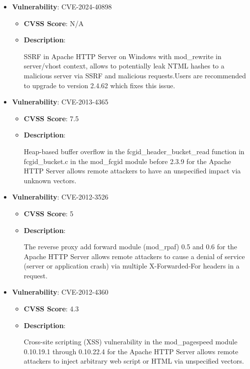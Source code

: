\documentclass{article}
\begin{document}
\begin{itemize}
        \item \textbf{Vulnerability}: CVE-2024-40898
        \begin{itemize}
            \item \textbf{CVSS Score}:  N/A 
            \item \textbf{Description}:
            \parbox[t]{0.9\linewidth}{
                \ttfamily SSRF in Apache HTTP Server on Windows with mod\_rewrite in server/vhost context, allows to potentially leak NTML hashes to a malicious server via SSRF and malicious requests.Users are recommended to upgrade to version 2.4.62 which fixes this issue.
            }
        \end{itemize}
    
        \item \textbf{Vulnerability}: CVE-2013-4365
        \begin{itemize}
            \item \textbf{CVSS Score}:  7.5 
            \item \textbf{Description}:
            \parbox[t]{0.9\linewidth}{
                \ttfamily Heap-based buffer overflow in the fcgid\_header\_bucket\_read function in fcgid\_bucket.c in the mod\_fcgid module before 2.3.9 for the Apache HTTP Server allows remote attackers to have an unspecified impact via unknown vectors.
            }
        \end{itemize}
    
        \item \textbf{Vulnerability}: CVE-2012-3526
        \begin{itemize}
            \item \textbf{CVSS Score}:  5 
            \item \textbf{Description}:
            \parbox[t]{0.9\linewidth}{
                \ttfamily The reverse proxy add forward module (mod\_rpaf) 0.5 and 0.6 for the Apache HTTP Server allows remote attackers to cause a denial of service (server or application crash) via multiple X-Forwarded-For headers in a request.
            }
        \end{itemize}
    
        \item \textbf{Vulnerability}: CVE-2012-4360
        \begin{itemize}
            \item \textbf{CVSS Score}:  4.3 
            \item \textbf{Description}:
            \parbox[t]{0.9\linewidth}{
                \ttfamily Cross-site scripting (XSS) vulnerability in the mod\_pagespeed module 0.10.19.1 through 0.10.22.4 for the Apache HTTP Server allows remote attackers to inject arbitrary web script or HTML via unspecified vectors.
            }
        \end{itemize}
    

\end{itemize}
\end{document}
